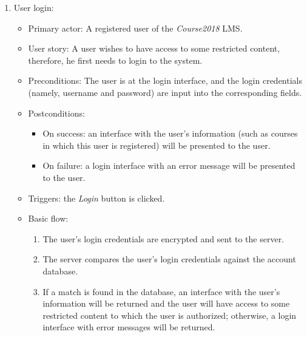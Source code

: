 \begin{enumerate}
\item User login:
\begin{itemize}
\item Primary actor:
    A registered user of the \emph{Course2018} LMS.
\item User story:
    A user wishes to have access to some restricted content, therefore, he
    first needs to login to the system.
\item Preconditions:
    The user is at the login interface, and the login credentials
    (namely, username and password) are input into the corresponding fields.
\item Postconditions:
    \begin{itemize}
        \item On success: an interface with the user's information (such as courses
            in which this user is registered) will be presented to the user.
        \item On failure: a login interface with an error message will be
            presented to the user.
    \end{itemize}
\item Triggers: the \emph{Login} button is clicked.
\item Basic flow:
    \begin{enumerate}
        \item The user's login credentials are encrypted and sent to the
            server.
        \item The server compares the user's login credentials against the
            account database.
        \item If a match is found in the database, an interface with the user's
            information will be returned and the user will have access to
            some restricted content to which the user is authorized; otherwise,
            a login interface with error messages will be returned.
    \end{enumerate}
\end{itemize}


\end{enumerate}
